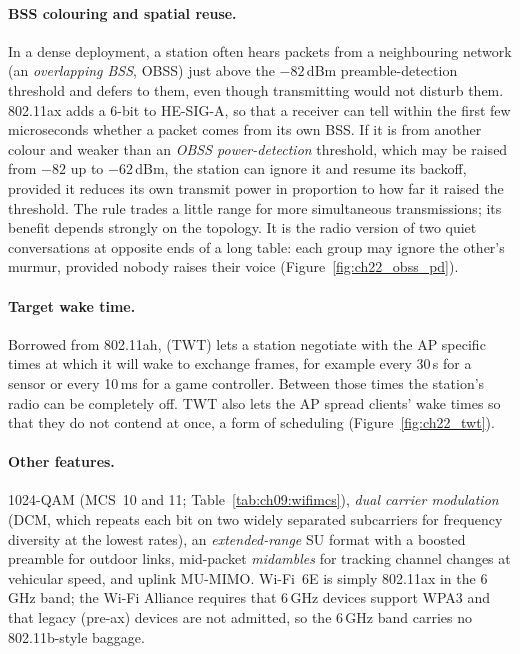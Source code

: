 \paragraph{BSS colouring and spatial reuse.} In a dense deployment, a station often hears packets
from a neighbouring network (an \emph{overlapping BSS}, OBSS) just above the $-82$\,dBm
preamble-detection threshold and defers to them, even though transmitting would not disturb them.
802.11ax adds a 6-bit  to HE-SIG-A, so that a receiver can tell within the first few
microseconds whether a packet comes from its own BSS. If it is from another colour and weaker than an
\emph{OBSS power-detection} threshold, which may be raised from $-82$ up to $-62$\,dBm, the station
can ignore it and resume its backoff, provided it reduces its own transmit power in proportion to
how far it raised the threshold. The rule trades a little range for more simultaneous
transmissions; its benefit depends strongly on the topology. It is the radio version of two quiet
conversations at opposite ends of a long table: each group may ignore the other's murmur, provided
nobody raises their voice (Figure~\ref{fig:ch22_obss_pd}).


\paragraph{Target wake time.} Borrowed from 802.11ah,  (TWT) lets a station
negotiate with the AP specific times at which it will wake to exchange frames, for example every
30\,s for a sensor or every 10\,ms for a game controller. Between those times the station's radio
can be completely off. TWT also lets the AP spread clients' wake times so that they do not contend
at once, a form of scheduling (Figure~\ref{fig:ch22_twt}).


\paragraph{Other features.} 1024-QAM (MCS~10 and 11; Table~\ref{tab:ch09:wifimcs}), \emph{dual
carrier modulation} (DCM, which repeats each bit on two widely separated subcarriers for frequency
diversity at the lowest rates), an \emph{extended-range} SU format with a boosted preamble for
outdoor links, mid-packet \emph{midambles} for tracking channel changes at vehicular speed, and
uplink MU-MIMO. Wi-Fi~6E is simply 802.11ax in the 6\,GHz band; the Wi-Fi Alliance requires that
6\,GHz devices support WPA3 and that legacy (pre-ax) devices are not admitted, so the 6\,GHz band
carries no 802.11b-style baggage.

